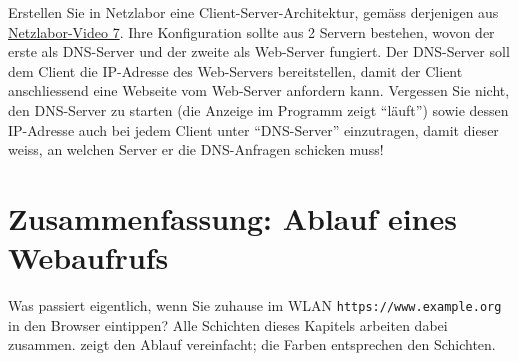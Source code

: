 \begin{myexercise}
	Erstellen Sie in Netzlabor eine Client-Server-Architektur, gemäss derjenigen aus \href{\netzlaborvideos}{Netzlabor-Video 7}. Ihre Konfiguration sollte aus 2 Servern bestehen, wovon der erste als \gls{DNS}-Server und der zweite als Web-Server fungiert. Der \gls{DNS}-Server soll dem Client die \gls{IP}-Adresse des Web-Servers bereitstellen, damit der Client anschliessend eine Webseite vom Web-Server anfordern kann. Vergessen Sie nicht, den \gls{DNS}-Server zu starten (die Anzeige im Programm zeigt \enquote{läuft}) sowie dessen \gls{IP}-Adresse auch bei jedem Client unter \enquote{\gls{DNS}-Server} einzutragen, damit dieser weiss, an welchen Server er die \gls{DNS}-Anfragen schicken muss!
\end{myexercise}

\section{Zusammenfassung: Ablauf eines Webaufrufs}\label{sec:webaufruf}

Was passiert eigentlich, wenn Sie zuhause im \gls{WLAN} \texttt{https://www.example.org} in den Browser eintippen? Alle Schichten dieses Kapitels arbeiten dabei zusammen.  zeigt den Ablauf vereinfacht; die Farben entsprechen den Schichten.

